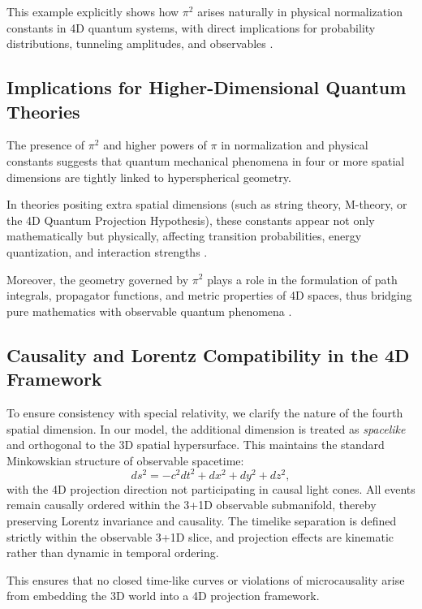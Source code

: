\documentclass[12pt,a4paper]{article}
\begin{document}
This example explicitly shows how \(\pi^{2}\) arises naturally in physical normalization constants in 4D quantum systems, with direct implications for probability distributions, tunneling amplitudes, and observables \cite{4d-wave-normalization}.

\subsection{Implications for Higher-Dimensional Quantum Theories}

The presence of \(\pi^{2}\) and higher powers of \(\pi\) in normalization and physical constants suggests that quantum mechanical phenomena in four or more spatial dimensions are tightly linked to hyperspherical geometry.

In theories positing extra spatial dimensions (such as string theory, M-theory, or the 4D Quantum Projection Hypothesis), these constants appear not only mathematically but physically, affecting transition probabilities, energy quantization, and interaction strengths \cite{extra-dimensions-pi}.

Moreover, the geometry governed by \(\pi^{2}\) plays a role in the formulation of path integrals, propagator functions, and metric properties of 4D spaces, thus bridging pure mathematics with observable quantum phenomena \cite{path-integrals-pi}.


\subsection{Causality and Lorentz Compatibility in the 4D Framework}

To ensure consistency with special relativity, we clarify the nature of the fourth spatial dimension. In our model, the additional dimension is treated as \emph{spacelike} and orthogonal to the 3D spatial hypersurface. This maintains the standard Minkowskian structure of observable spacetime:
\begin{equation}
ds^2 = -c^2 dt^2 + dx^2 + dy^2 + dz^2,
\end{equation}
with the 4D projection direction not participating in causal light cones. All events remain causally ordered within the 3+1D observable submanifold, thereby preserving Lorentz invariance and causality. The timelike separation is defined strictly within the observable 3+1D slice, and projection effects are kinematic rather than dynamic in temporal ordering.

This ensures that no closed time-like curves or violations of microcausality arise from embedding the 3D world into a 4D projection framework.
\end{document}
